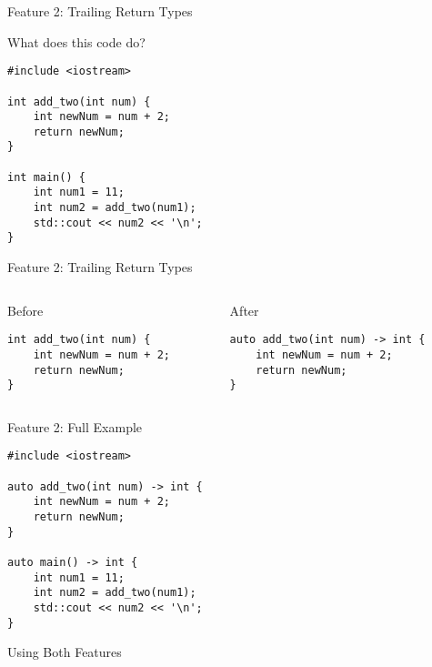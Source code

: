 \documentclass[t]{beamer}
\begin{document}
\begin{frame}[fragile]{Feature 2: Trailing Return Types}

	What does this code do?
	\medbreak
	\begin{verbatim}
#include <iostream>

int add_two(int num) {
	int newNum = num + 2;
	return newNum;
}

int main() {
	int num1 = 11;
	int num2 = add_two(num1);
	std::cout << num2 << '\n';
}
\end{verbatim}
\end{frame}


\begin{frame}[fragile]{Feature 2: Trailing Return Types}
	\begin{columns}[]
		\begin{column}{.44\textwidth}
			{\large Before}
			\begin{verbatim}
int add_two(int num) {
	int newNum = num + 2;
	return newNum;
}
			\end{verbatim}
		\end{column}
		\pause
		\begin{column}{.5\textwidth}
			{\large After}
			\begin{verbatim}
auto add_two(int num) -> int {
	int newNum = num + 2;
	return newNum;
}
			\end{verbatim}
		\end{column}
	\end{columns}
\end{frame}


\begin{frame}[fragile]{Feature 2: Full Example}
	\medbreak
	\begin{verbatim}
#include <iostream>

auto add_two(int num) -> int {
	int newNum = num + 2;
	return newNum;
}

auto main() -> int {
	int num1 = 11;
	int num2 = add_two(num1);
	std::cout << num2 << '\n';
}
\end{verbatim}
\end{frame}


\begin{frame}[fragile]{Using Both Features}
	\medbreak
	\inputminted{cpp}{./code/auto.cpp}
\end{frame}
\end{document}
